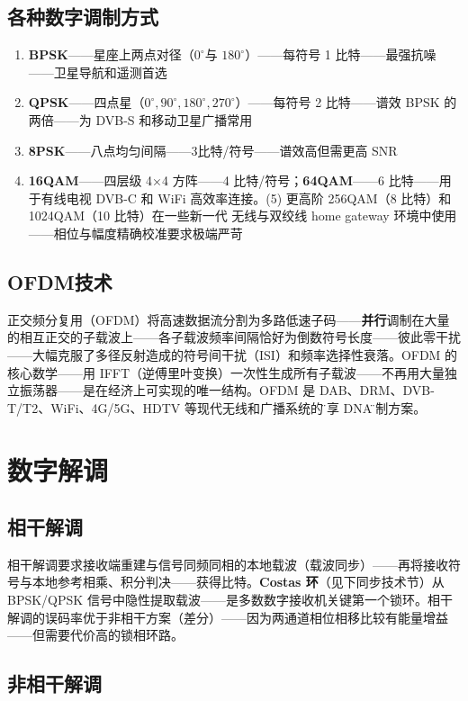 \documentclass[12pt,UTF8]{ctexbook}
\begin{document}
\subsection{各种数字调制方式}


\begin{enumerate}
\item \textbf{BPSK}——星座上两点对径（$0^\circ$与 $180^\circ$）——每符号 1 比特——最强抗噪——卫星导航和遥测首选
\item \textbf{QPSK}——四点星（$0^\circ,90^\circ,180^\circ,270^\circ$）——每符号 2 比特——谱效 BPSK 的两倍——为 DVB-S 和移动卫星广播常用
\item \textbf{8PSK}——八点均匀间隔——3比特/符号——谱效高但需更高 SNR
\item \textbf{16QAM}——四层级 4×4 方阵——4 比特/符号；\textbf{64QAM}——6 比特——用于有线电视 DVB-C 和 WiFi 高效率连接。(5) 更高阶 256QAM（8 比特）和 1024QAM（10 比特）在一些新一代 无线与双绞线 home gateway 环境中使用——相位与幅度精确校准要求极端严苛
\end{enumerate}

\subsection{OFDM技术}

正交频分复用（OFDM）将高速数据流分割为多路低速子码——\textbf{并行}调制在大量的相互正交的子载波上——各子载波频率间隔恰好为倒数符号长度——彼此零干扰——大幅克服了多径反射造成的符号间干扰（ISI）和频率选择性衰落。OFDM 的核心数学——用 IFFT（逆傅里叶变换）一次性生成所有子载波——不再用大量独立振荡器——是在经济上可实现的唯一结构。OFDM 是 DAB、DRM、DVB-T/T2、WiFi、4G/5G、HDTV 等现代无线和广播系统的\"共享 DNA\"调制方案。

\section{数字解调}
\label{sec:digital_demod}

\subsection{相干解调}

相干解调要求接收端重建与信号同频同相的本地载波（载波同步）——再将接收符号与本地参考相乘、积分判决——获得比特。\textbf{Costas 环}（见下同步技术节）从 BPSK/QPSK 信号中隐性提取载波——是多数数字接收机关键第一个锁环。相干解调的误码率优于非相干方案（差分）——因为两通道相位相移比较有能量增益——但需要代价高的锁相环路。

\subsection{非相干解调}
\end{document}

